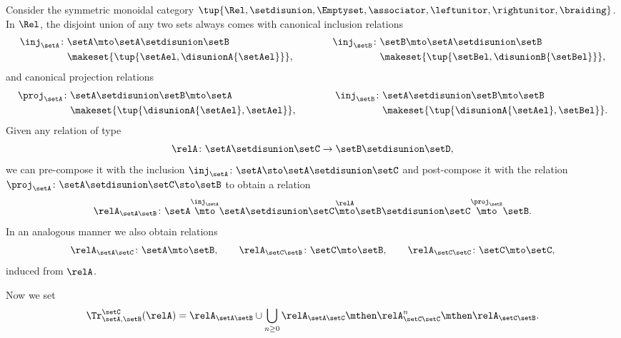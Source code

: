 \begin{definition}
Consider the symmetric monoidal category $\tup{\Rel, \setdisunion, \Emptyset, \associator, \leftunitor, \rightunitor, \braiding}$. In $\Rel$, the disjoint union of any two sets always comes with canonical inclusion relations
    \begin{equation}
        \begin{aligned}
            \inj_\setA\colon & \setA \mto \setA\setdisunion\setB \\
            & \makeset{ \tup{\setAel, \disunionA{\setAel}}},
        \end{aligned}
\qquad \qquad
        \begin{aligned}
            \inj_\setB\colon & \setB  \mto \setA\setdisunion\setB \\
            & \makeset{ \tup{\setBel, \disunionB{\setBel}}},
        \end{aligned}
    \end{equation}
and canonical projection relations
    \begin{equation}
        \begin{aligned}
            \proj_\setA\colon & \setA\setdisunion\setB \mto \setA \\
            &  \makeset{ \tup{\disunionA{\setAel}, \setAel}},
        \end{aligned}
\qquad \qquad
        \begin{aligned}
            \inj_\setB\colon & \setA\setdisunion\setB  \mto \setB \\
            & \makeset{ \tup{\disunionA{\setAel}, \setBel}}. 
        \end{aligned}
    \end{equation}
Given any relation of type
\begin{equation}
\relA \colon \setA \setdisunion \setC \to \setB \setdisunion \setD,
\end{equation}
we can pre-compose it with the inclusion $\inj_\setA \colon \setA \sto \setA\setdisunion\setC$ and post-compose it with the relation $\proj_\setA\colon \setA\setdisunion\setC \sto \setB$ to obtain a relation 
\begin{equation}
\relA_{\setA \setB} \colon \setA \overset{\inj_\setA}{\mto} \setA \setdisunion \setC \overset{\relA}{\mto} \setB \setdisunion \setC \overset{\proj_\setB}{\mto} \setB.
\end{equation}
In an analogous manner we also obtain relations
\begin{equation}
\relA_{\setA \setC} \colon \setA \mto \setB, \qquad \relA_{\setC \setB} \colon \setC \mto \setB, \qquad \relA_{\setC \setC} \colon \setC \mto \setC,
\end{equation}
induced from $\relA$. 

Now we set
\begin{equation}
\Tr_{\setA,\setB}^\setC (\relA) = \relA_{\setA \setB} \cup \bigcup_{n \geq 0} \relA_{\setA \setC} \mthen \relA_{\setC \setC}^n \mthen \relA_{\setC \setB}.
\end{equation}
\end{definition}

